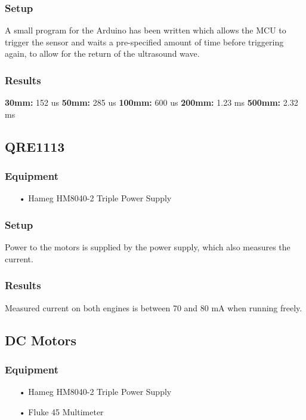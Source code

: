 \subsubsection{Setup}
A small program for the Arduino has been written which allows the MCU to trigger the sensor and waits a pre-specified amount of time before triggering again, to allow for the return of the ultrasound wave. 

\subsubsection{Results}
\textbf{30mm:} 152 us
\textbf{50mm:} 285 us
\textbf{100mm:} 600 us
\textbf{200mm:} 1.23 ms
\textbf{500mm:} 2.32 ms

\subsection{QRE1113}

\subsubsection{Equipment}
\begin{enumerate}
    \item[•]Hameg HM8040-2 Triple Power Supply
\end{enumerate}

\subsubsection{Setup}
Power to the motors is supplied by the power supply, which also measures the current.

\subsubsection{Results}
Measured current on both engines is between 70 and 80 mA when running freely.


\subsection{DC Motors}

\subsubsection{Equipment}
\begin{enumerate}
	\item[•]Hameg HM8040-2 Triple Power Supply
	\item[•]Fluke 45 Multimeter
\end{enumerate}

